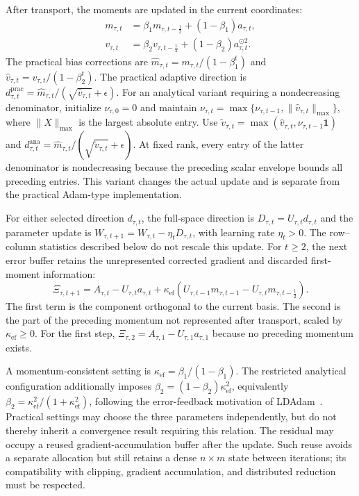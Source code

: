 \documentclass[fleqn,10pt]{wlscirep}
\begin{document}
After transport, the moments are updated in the current coordinates:
\begin{equation}
\begin{aligned}
m_{\tau,t}&=\beta_1m_{\tau,t-\frac12}+(1-\beta_1)a_{\tau,t},\\
v_{\tau,t}&=\beta_2v_{\tau,t-\frac12}+(1-\beta_2)a_{\tau,t}^{\odot2}.
\end{aligned}
\label{eq:first_moment_update}
\end{equation}
The practical bias corrections are $\widehat m_{\tau,t}=m_{\tau,t}/(1-\beta_1^t)$ and $\widehat v_{\tau,t}=v_{\tau,t}/(1-\beta_2^t)$. The practical adaptive direction is $d_{\tau,t}^{\mathrm{prac}}= \widehat m_{\tau,t}/(\sqrt{\widehat v_{\tau,t}}+\epsilon)$. For an analytical variant requiring a nondecreasing denominator, initialize $\nu_{\tau,0}=0$ and maintain $\nu_{\tau,t}=\max\{\nu_{\tau,t-1},\|\widehat v_{\tau,t}\|_{\max}\}$, where $\|X\|_{\max}$ is the largest absolute entry. Use $\widetilde v_{\tau,t}= \max(\widehat v_{\tau,t},\nu_{\tau,t-1}\mathbf{1})$ and $d_{\tau,t}^{\mathrm{ana}}= \widehat m_{\tau,t}/(\sqrt{\widetilde v_{\tau,t}}+\epsilon)$. At fixed rank, every entry of the latter denominator is nondecreasing because the preceding scalar envelope bounds all preceding entries. This variant changes the actual update and is separate from the practical Adam-type implementation.

For either selected direction $d_{\tau,t}$, the full-space direction is $D_{\tau,t}=U_{\tau,t}d_{\tau,t}$ and the parameter update is $W_{\tau,t+1}=W_{\tau,t}-\eta_tD_{\tau,t}$, with learning rate $\eta_t>0$. The row--column statistics described below do not rescale this update. For $t\geq2$, the next error buffer retains the unrepresented corrected gradient and discarded first-moment information:
\begin{equation}
\Xi_{\tau,t+1}=A_{\tau,t}-U_{\tau,t}a_{\tau,t}+\kappa_{\mathrm{ef}}\left(U_{\tau,t-1}m_{\tau,t-1}-U_{\tau,t}m_{\tau,t-\frac12}\right).
\label{eq:generalized_error}
\end{equation}
The first term is the component orthogonal to the current basis. The second is the part of the preceding momentum not represented after transport, scaled by $\kappa_{\mathrm{ef}}\geq0$. For the first step, $\Xi_{\tau,2}=A_{\tau,1}-U_{\tau,1}a_{\tau,1}$ because no preceding momentum exists.

A momentum-consistent setting is $\kappa_{\mathrm{ef}}=\beta_1/(1-\beta_1)$. The restricted analytical configuration additionally imposes $\beta_2=(1-\beta_2)\kappa_{\mathrm{ef}}^2$, equivalently $\beta_2=\kappa_{\mathrm{ef}}^2/(1+\kappa_{\mathrm{ef}}^2)$, following the error-feedback motivation of LDAdam~\cite{ldadam2025}. Practical settings may choose the three parameters independently, but do not thereby inherit a convergence result requiring this relation. The residual may occupy a reused gradient-accumulation buffer after the update. Such reuse avoids a separate allocation but still retains a dense $n\times m$ state between iterations; its compatibility with clipping, gradient accumulation, and distributed reduction must be respected.
\end{document}

